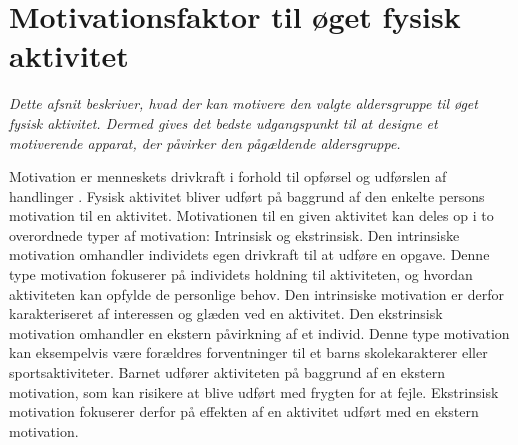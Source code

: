 \section{Motivationsfaktor til øget fysisk aktivitet}\label{motivation_boern}
\textit{Dette afsnit beskriver, hvad der kan motivere den valgte aldersgruppe til øget fysisk aktivitet. Dermed gives det bedste udgangspunkt til at designe et motiverende apparat, der påvirker den pågældende aldersgruppe.}

Motivation er menneskets drivkraft i forhold til opførsel og udførslen af handlinger \citep{V.Brown2007}. Fysisk aktivitet bliver udført på baggrund af den enkelte persons motivation til en aktivitet. Motivationen til en given aktivitet kan deles op i to overordnede typer af motivation: Intrinsisk og ekstrinsisk. Den intrinsiske motivation omhandler individets egen drivkraft til at udføre en opgave. Denne type motivation fokuserer på individets holdning til aktiviteten, og hvordan aktiviteten kan opfylde de personlige behov. Den intrinsiske motivation er derfor karakteriseret af interessen og glæden ved en aktivitet. Den ekstrinsisk motivation omhandler en ekstern påvirkning af et individ. Denne type motivation kan eksempelvis være forældres forventninger til et barns skolekarakterer eller sportsaktiviteter. Barnet udfører aktiviteten på baggrund af en ekstern motivation, som kan risikere at blive udført med frygten for at fejle. Ekstrinsisk motivation fokuserer derfor på effekten af en aktivitet udført med en ekstern motivation. \citep{J.Sebire2013} 

